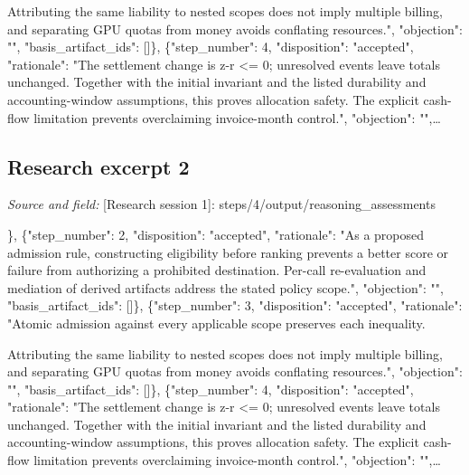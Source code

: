 \documentclass[11pt]{article}
\begin{document}
Attributing the same liability to nested scopes does not imply multiple billing, and separating GPU quotas from money avoids conflating resources.", "objection": "", "basis\_artifact\_ids": []\}, \{"step\_number": 4, "disposition": "accepted", "rationale": "The settlement change is z-r \textless{}= 0; unresolved events leave totals unchanged. Together with the initial invariant and the listed durability and accounting-window assumptions, this proves allocation safety. The explicit cash-flow limitation prevents overclaiming invoice-month control.", "objection": "",\ldots{}

\subsection{Research excerpt 2}
\textit{Source and field: }[Research session 1]: steps/4/output/reasoning\_assessments\par
[\{"step\_number": 1, "disposition": "unresolved", "rationale": "The attribution matches the supplied project description, and the separation of published gateway claims from proposed extensions is appropriate. No original source establishes those capabilities here.", "objection": "The entry is labeled an assumption, but the published-capability premise is not one of the five explicit conditions of the ledger claim. Retain it as unverified background, not an established premise.

The ledger proof does not require it.", "basis\_artifact\_ids": []\}, \{"step\_number": 2, "disposition": "accepted", "rationale": "As a proposed admission rule, constructing eligibility before ranking prevents a better score or failure from authorizing a prohibited destination. Per-call re-evaluation and mediation of derived artifacts address the stated policy scope.", "objection": "", "basis\_artifact\_ids": []\}, \{"step\_number": 3, "disposition": "accepted", "rationale": "Atomic admission against every applicable scope preserves each inequality.

Attributing the same liability to nested scopes does not imply multiple billing, and separating GPU quotas from money avoids conflating resources.", "objection": "", "basis\_artifact\_ids": []\}, \{"step\_number": 4, "disposition": "accepted", "rationale": "The settlement change is z-r \textless{}= 0; unresolved events leave totals unchanged. Together with the initial invariant and the listed durability and accounting-window assumptions, this proves allocation safety. The explicit cash-flow limitation prevents overclaiming invoice-month control.", "objection": "",\ldots{}
\end{document}
